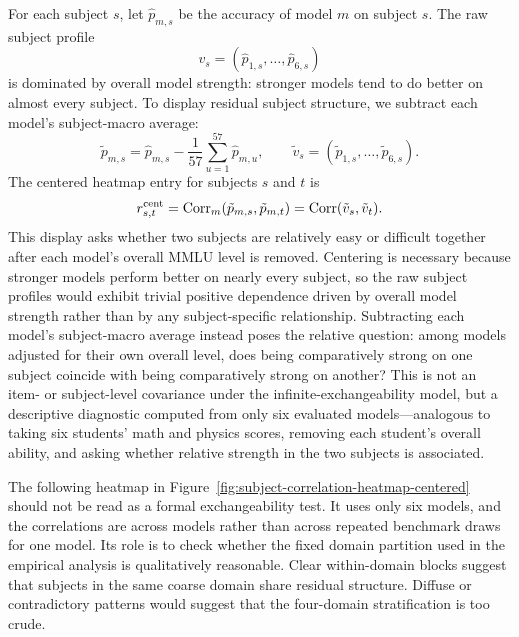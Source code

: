 \documentclass[11pt]{article}
\theoremstyle{definition}
\theoremstyle{remark}
\begin{document}
For each subject \(s\), let \(\hat p_{m,s}\) be the accuracy of model \(m\) on subject \(s\).  The raw subject profile
\[
    v_s
    =
    (\hat p_{1,s},\ldots,\hat p_{6,s})
\]
is dominated by overall model strength: stronger models tend to do better on almost every subject.  To display residual subject structure, we subtract each model's subject-macro average:
\[
    \tilde p_{m,s}
    =
    \hat p_{m,s}
    -
    \frac1{57}
    \sum_{u=1}^{57}\hat p_{m,u},
    \qquad
    \tilde v_s
    =
    (\tilde p_{1,s},\ldots,\tilde p_{6,s}).
\]
The centered heatmap entry for subjects \(s\) and \(t\) is
\[
    r^{\rm cent}_{s,t}
    =
    \operatorname{Corr}_m(\tilde p_{m,s},\tilde p_{m,t})
    =
    \operatorname{Corr}(\tilde v_s,\tilde v_t).
\]
This display asks whether two subjects are relatively easy or difficult together
after each model's overall MMLU level is removed.  Centering is necessary because
stronger models perform better on nearly every subject, so the raw subject
profiles would exhibit trivial positive dependence driven by overall model
strength rather than by any subject-specific relationship.  Subtracting each
model's subject-macro average instead poses the relative question: among models
adjusted for their own overall level, does being comparatively strong on one
subject coincide with being comparatively strong on another?  This is not an
item- or subject-level covariance under the infinite-exchangeability model, but a
descriptive diagnostic computed from only six evaluated models---analogous to
taking six students' math and physics scores, removing each student's overall
ability, and asking whether relative strength in the two subjects is associated.

The following heatmap in Figure~\ref{fig:subject-correlation-heatmap-centered} should not be read as a formal exchangeability test. It uses only six models, and the correlations are across models rather than across repeated benchmark draws for one model. Its role is to check whether the fixed domain partition used in the empirical analysis is qualitatively reasonable. Clear within-domain blocks suggest that subjects in the same coarse domain share residual structure.  Diffuse or contradictory patterns would suggest that the four-domain stratification is too crude.

\end{document}
